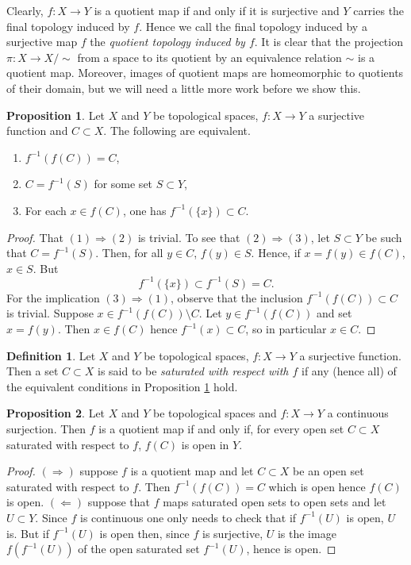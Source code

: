 \documentclass{book}
\theoremstyle{definition}
\newtheorem{proposition}{Proposition}[section]
\newtheorem{definition}{Definition}[section]
\theoremstyle{remark}
\begin{document}
Clearly, $f:X\to Y$ is a quotient map if and only if it is surjective and $Y$ carries the final topology induced by $f$. Hence we call the final topology induced by a surjective map $f$ the \textit{quotient topology induced by $f$}. It is clear that the projection $\pi:X\to X/{\sim}$ from a space to its quotient by an equivalence relation $\sim$ is a quotient map. Moreover, images of quotient maps are homeomorphic to quotients of their domain, but we will need a little more work before we show this.

\begin{proposition}
\label{saturatedequiv}
Let $X$ and $Y$ be topological spaces, $f:X\to Y$ a surjective function and $C\subset X$. The following are equivalent.
\begin{enumerate}
    \item $f^{-1}(f(C))=C$,
    \item $C=f^{-1}(S)$ for some set $S\subset Y$,
    \item For each $x\in f(C)$, one has $f^{-1}(\{x\})\subset C$.
\end{enumerate}
\end{proposition}
\begin{proof}
That $(1)\Rightarrow(2)$ is trivial. To see that $(2)\Rightarrow (3)$, let $S\subset Y$ be such that $C=f^{-1}(S)$. Then, for all $y\in C$, $f(y)\in S$. Hence, if $x=f(y)\in f(C)$, $x\in S$. But $$f^{-1}(\{x\})\subset f^{-1}(S)=C.$$
For the implication $(3)\Rightarrow(1)$, observe that the inclusion $f^{-1}(f(C))\subset C$ is trivial. Suppose $x\in f^{-1}(f(C))\setminus C$. Let $y\in f^{-1}(f(C))$ and set $x=f(y)$. Then $x\in f(C)$ hence $f^{-1}(x)\subset C$, so in particular $x\in C$.
\end{proof}

\begin{definition}
Let $X$ and $Y$ be topological spaces, $f:X\to Y$ a surjective function. Then a set $C\subset X$ is said to be \textit{saturated with respect with $f$} if any (hence all) of the equivalent conditions in Proposition \ref{saturatedequiv} hold.
\end{definition}

\begin{proposition}
Let $X$ and $Y$ be topological spaces and $f:X\to Y$ a continuous surjection. Then $f$ is a quotient map if and only if, for every open set $C\subset X$ saturated with respect to $f$, $f(C)$ is open in $Y$.
\end{proposition}
\begin{proof}
$(\Rightarrow)$ suppose $f$ is a quotient map and let $C\subset X$ be an open set saturated with respect to $f$. Then $f^{-1}(f(C))=C$ which is open hence $f(C)$ is open. $(\Leftarrow)$ suppose that $f$ maps saturated open sets to open sets and let $U\subset Y$. Since $f$ is continuous one only needs to check that if $f^{-1}(U)$ is open, $U$ is. But if $f^{-1}(U)$ is open then, since $f$ is surjective, $U$ is the image $f(f^{-1}(U))$ of the open saturated set $f^{-1}(U)$, hence is open.
\end{proof}
\end{document}
